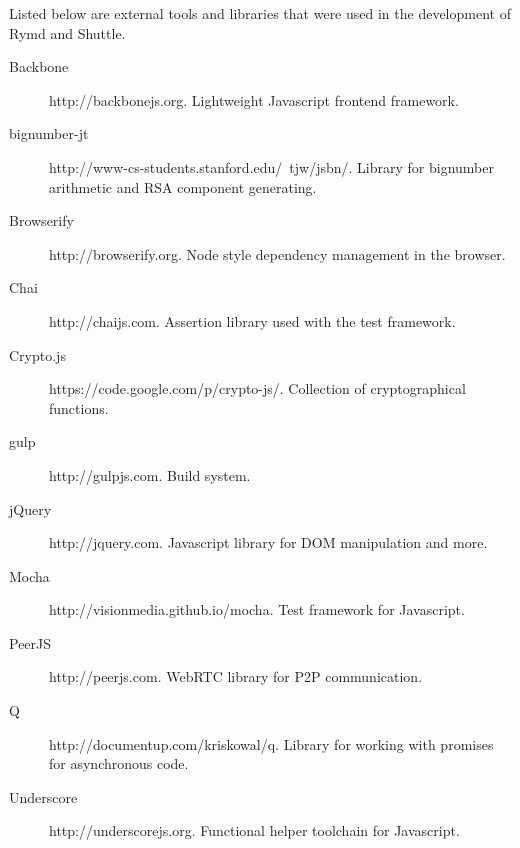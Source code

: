 Listed below are external tools and libraries that were used in the development of Rymd and Shuttle.

\begin{description}
  \item[Backbone] http://backbonejs.org. Lightweight Javascript frontend framework.
  \item[bignumber-jt] http://www-cs-students.stanford.edu/~tjw/jsbn/. Library for bignumber arithmetic and RSA component generating.
  \item[Browserify] http://browserify.org. Node style dependency management in the browser.
  \item[Chai] http://chaijs.com. Assertion library used with the test framework.
  \item[Crypto.js] https://code.google.com/p/crypto-js/. Collection of cryptographical functions.
  \item[gulp] http://gulpjs.com. Build system.
  \item[jQuery] http://jquery.com. Javascript library for DOM manipulation and more.
  \item[Mocha] http://visionmedia.github.io/mocha. Test framework for Javascript.
  \item[PeerJS] http://peerjs.com. WebRTC library for P2P communication.
  \item[Q] http://documentup.com/kriskowal/q. Library for working with promises for asynchronous code.
  \item[Underscore] http://underscorejs.org. Functional helper toolchain for Javascript.
\end{description}
